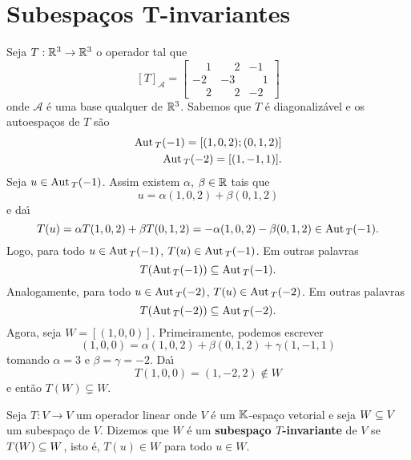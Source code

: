 \section{Subespa\c{c}os T-invariantes} %
\label{sec:subespacos_T-invariantes}
Seja $T : \mathbb{R}^3 \to \mathbb{R}^3$ o operador tal que
		\[
	[T]_\mathcal{A} = \begin{bmatrix}
			\phantom{-}1 & \phantom{-}2 & -1\\
			-2 & -3 & \phantom{-}1\\
			\phantom{-}2 & \phantom{-}2 & -2
		\end{bmatrix}
		\]
onde $\mathcal{A}$ \'e uma base qualquer de $\mathbb{R}^3$. Sabemos que $T$ \'e diagonaliz\'avel e os autoespa\c{c}os de $T$ s\~ao
\begin{align*}
	{\rm Aut\,}_T(-1) = [(1,0,2); (0,1,2)]\\
	{\rm Aut\,}_T(-2) = [(1,-1,1)].
\end{align*}
Seja $u \in {\rm Aut\,}_T(-1)$. Assim existem $\alpha$, $\beta \in \mathbb{R}$ tais que
\[
	u = \alpha(1,0,2) + \beta(0,1,2)
\]
e da{\'\i}
\[
	T(u) = \alpha T(1,0,2) + \beta T(0,1,2) = -\alpha(1,0,2) - \beta(0,1,2) \in {\rm Aut\,}_T(-1).
\]
Logo, para todo $u \in {\rm Aut\,}_T(-1)$, $T(u) \in {\rm Aut\,}_T(-1)$. Em outras palavras
\[
	T({\rm Aut\,}_T(-1)) \subseteq {\rm Aut\,}_T(-1).
\]
Analogamente, para todo $u \in {\rm Aut\,}_T(-2)$, $T(u) \in {\rm Aut\,}_T(-2)$. Em outras palavras
\[
	T({\rm Aut\,}_T(-2)) \subseteq {\rm Aut\,}_T(-2).
\]
Agora, seja $W = [(1,0,0)]$. Primeiramente, podemos escrever
\[
	(1,0,0) = \alpha(1,0,2) + \beta(0,1,2) + \gamma(1,-1,1)
\]
tomando $\alpha = 3$ e $\beta = \gamma = -2$. Da{\'\i}
\[
	T(1,0,0) = (1,-2,2) \notin W
\]
e ent\~ao $T(W) \varsubsetneq W$.

\begin{definicao}
	Seja $T : V \to V$ um operador linear onde $V$ \'e um $\mathbb{K}$-espa\c{c}o vetorial e seja $W \subseteq V$ um subespa\c{c}o de $V$. Dizemos que $W$ \'e um \textbf{subespa\c{c}o $T$-invariante} de $V$ se $T(W) \subseteq W$, isto \'e, $T(u) \in W$ para todo $u \in W$.
\end{definicao}

